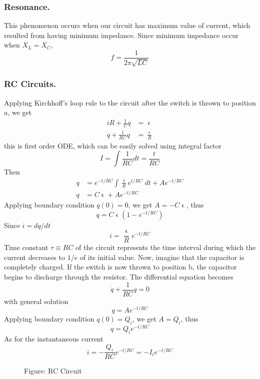 \documentclass[../../../main.tex]{subfiles}
\begin{document}
\subsubsection*{Resonance.} This phenomenon occurs when our circuit has maximum value of current, which resulted from having minimum impedance. Since minimum impedance occur when $X_L=X_C$,
\begin{equation*}
    f=\frac{1}{2\pi\sqrt{LC}}
\end{equation*}

\subsubsection*{RC Circuits.} Applying Kirchhoff’s loop rule to the circuit after the switch is thrown to position $a$, we get 
\begin{align*}
    iR+\frac{1}{C}q&=\upvarepsilon\\
    \dot{q}+\frac{1}{RC}q&=\frac{\upvarepsilon}{R}
\end{align*}
this is first order ODE, which can be easily solved using integral factor
\begin{equation*}
    I=\int \frac{1}{RC}dt=\frac{t}{RC}
\end{equation*} 
Then
\begin{align*}
    q&=e^{-t/RC}\int \frac{\upvarepsilon}{R}e^{t/RC}\;dt+Ae^{-t/RC}\\
    q&=C\upvarepsilon+Ae^{-t/RC}
\end{align*}
Applying boundary condition $q(0)=0$, we get $A=-C\upvarepsilon$, thus 
\begin{equation*}
    q=C\upvarepsilon(1-e^{-t/RC})
\end{equation*}
Since $i=dq/dt$
\begin{equation*}
    i=\frac{\upvarepsilon}{R}e^{-t/RC}
\end{equation*}
Time constant $\tau\equiv RC$ of the circuit represents the time interval during which the current decreases to $1/e$ of its initial value. Now, imagine that the capacitor is completely charged. If the switch is now thrown to position b, the capacitor begins to discharge through the resistor. The differential equation becomes
\begin{equation*}   
    \dot{q}+\frac{1}{RC}q=0
\end{equation*}
with general solution 
\begin{equation*}
    q=Ae^{-t/RC}
\end{equation*}
Applying boundary condition $q(0)=Q_i$, we get $A=Q_i$, thus 
\begin{equation*}
    q=Q_ie^{-t/RC}
\end{equation*}
As for the instantaneous current
\begin{equation*}
i=-\frac{Q_i}{RC}e^{-t/RC}=-I_ie^{-t/RC}
\end{equation*}
\begin{figure*}
    \centering
    \caption*{Figure: RC Circuit}
\end{figure*}
\end{document}
